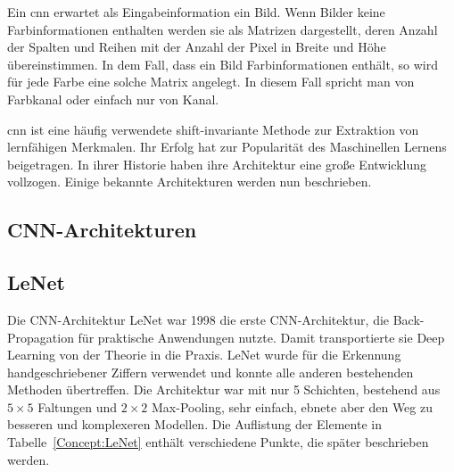 Ein \ac{cnn} erwartet als Eingabeinformation ein Bild. Wenn Bilder keine Farbinformationen enthalten werden sie als Matrizen dargestellt, deren Anzahl der Spalten und Reihen mit der Anzahl der Pixel in Breite und Höhe übereinstimmen. In dem Fall, dass ein Bild Farbinformationen enthält, so wird für jede Farbe eine solche Matrix angelegt. In diesem Fall spricht man von Farbkanal oder einfach nur von Kanal.


\ac{cnn} ist eine häufig verwendete shift-invariante Methode zur Extraktion von lernfähigen Merkmalen. Ihr Erfolg hat zur Popularität des Maschinellen Lernens beigetragen. In ihrer Historie haben ihre Architektur eine große Entwicklung vollzogen. Einige bekannte Architekturen werden nun beschrieben.    

\subsection{CNN-Architekturen}


\subsection{LeNet}

Die CNN-Architektur LeNet war 1998 die erste CNN-Architektur, die Back-Propagation für praktische Anwendungen nutzte. Damit transportierte sie Deep Learning von der Theorie in die Praxis. LeNet wurde für die Erkennung handgeschriebener Ziffern verwendet und konnte alle anderen bestehenden Methoden übertreffen. Die Architektur war mit nur 5 Schichten, bestehend aus $5\times 5$ Faltungen und $2 \times 2$ Max-Pooling, sehr einfach, ebnete aber den Weg zu besseren und komplexeren Modellen. \cite{LeCun:1998} Die Auflistung der Elemente in Tabelle~\ref{Concept:LeNet} enthält verschiedene Punkte, die später beschrieben werden.





